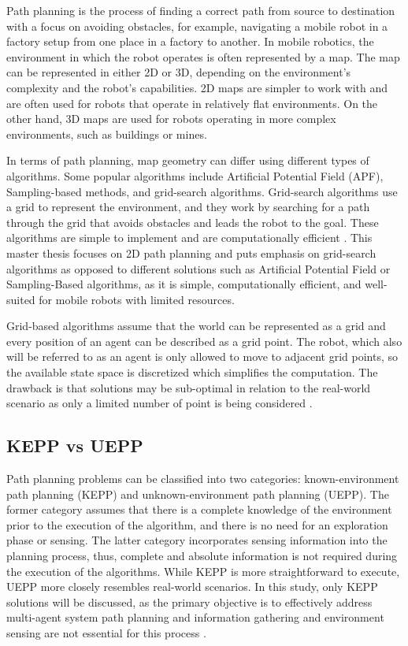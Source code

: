 Path planning is the process of finding a correct path from source to destination with a focus on avoiding obstacles, for example, navigating a mobile robot in a factory setup from one place in a factory to another\cite{path_planning}. In mobile robotics, the environment in which the robot operates is often represented by a map. The map can be represented in either 2D or 3D, depending on the environment's complexity and the robot's capabilities. 2D maps are simpler to work with and are often used for robots that operate in relatively flat environments. On the other hand, 3D maps are used for robots operating in more complex environments, such as buildings or mines.

In terms of path planning, map geometry can differ using different types of algorithms. Some popular algorithms include Artificial Potential Field (APF), Sampling-based methods, and grid-search algorithms. Grid-search algorithms use a grid to represent the environment, and they work by searching for a path through the grid that avoids obstacles and leads the robot to the goal. These algorithms are simple to implement and are computationally efficient \cite{not_grid_based}. This master thesis focuses on 2D path planning and  puts emphasis on grid-search algorithms as opposed to different solutions such as Artificial Potential Field or Sampling-Based algorithms, as it is simple, computationally efficient, and well-suited for mobile robots with limited resources.

Grid-based algorithms assume that the world can be represented as a grid and every position of an agent can be described as a grid point. The robot, which also will be referred to as an agent is only allowed to move to adjacent grid points, so the available state space is discretized which simplifies the computation. The drawback is that solutions may be sub-optimal in relation to the real-world scenario as only a limited number of point is being considered \cite{SARANYA2014766}.

\subsection{KEPP vs UEPP}
Path planning problems can be classified into two categories: known-environment path planning (KEPP) and unknown-environment path planning (UEPP). The former category assumes that there is a complete knowledge of the environment prior to the execution of the algorithm, and there is no need for an exploration phase or sensing. The latter category incorporates sensing information into the planning process, thus, complete and absolute information is not required during the execution of the algorithms. While KEPP is more straightforward to execute, UEPP more closely resembles real-world scenarios. In this study, only KEPP solutions will be discussed, as the primary objective is to effectively address multi-agent system path planning and information gathering and environment sensing are not essential for this process \cite{path_planning_protocols}.